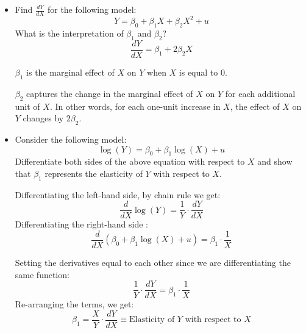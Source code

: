 \documentclass{./../../Latex/handout}
\begin{document}
\newpage 
\begin{itemize}
	\item 
Find $\frac{dY}{dX}$ for the following model:
$$ Y = \beta_0 + \beta_1 X + \beta_2 X^2 + u $$
What is the interpretation of $\beta_1$ and $\beta_2$?
$$ \frac{dY}{dX}  = \beta_1 + 2 \beta_2 X $$

\(\beta_1\) is the marginal effect of \(X\) on \(Y\) when \(X\) is equal to 0. 

\(\beta_2\) captures the change in the marginal effect of \(X\) on \(Y\) for each additional unit of \(X\). In other words, for each one-unit increase in \(X\), the effect of \(X\) on \(Y\) changes by \(2\beta_2\). \\

\item Consider the following model:
$$ \log(Y) = \beta_0 +  \beta_1 \log(X) + u$$
Differentiate both sides of the above equation with respect to $X$ and show that \(\beta_1\) represents the elasticity of \(Y\) with respect to \(X\). 

Differentiating the left-hand side, by chain rule we get:
\[ \frac{d}{dX} \log(Y) = \frac{1}{Y} \cdot \frac{dY}{dX} \]
Differentiating the right-hand side :
\[ \frac{d}{dX} (\beta_0 + \beta_1 \log(X) + u) = \beta_1 \cdot \frac{1}{X} \]

Setting the derivatives equal to each other since we are differentiating the same function:
\[ \frac{1}{Y} \cdot \frac{dY}{dX} = \beta_1 \cdot \frac{1}{X} \]
Re-arranging the terms, we get:
\[ \beta_1 = \frac{X}{Y} \cdot \frac{dY}{dX} \equiv \text{Elasticity of \(Y\) with respect to \(X\)}  \]
\end{itemize}
\end{document}
